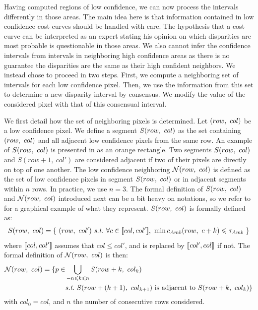 Having computed regions of low confidence, we can now process the intervals differently in those areas. The main idea here is that information contained in low confidence cost curves should be handled with care. The hypothesis that a cost curve can be interpreted as an expert stating his opinion on which disparities are most probable is questionable in those areas. We also cannot infer the confidence intervals from intervals in neighboring high confidence areas as there is no guarantee the disparities are the same as their high confident neighbors. We instead chose to proceed in two steps. First, we compute a neighboring set of intervals for each low confidence pixel. Then, we use the information from this set to determine a new disparity interval by consensus. We modify the value of the considered pixel with that of this consensual interval.

We first detail how the set of neighboring pixels is determined. Let $(row, ~col)$ be a low confidence pixel. We define a segment $S(row, ~col)$ as the set containing $(row, ~col)$ and all adjacent low confidence pixels from the same row. An example of $S(row, ~col)$ is presented in  as an orange rectangle. Two segments $S(row, ~col)$ and $S(row+1, ~col')$ are considered adjacent if two of their pixels are directly on top of one another. The low confidence neighboring $\mathcal{N}(row,~col)$ is defined as the set of low confidence pixels in segment $S(row, ~col)$ or in adjacent segments within $n$ rows. In practice, we use $n=3$. The formal definition of $S(row, ~col)$ and $\mathcal{N}(row,~col)$  introduced next can be a bit heavy on notations, so we refer to  for a graphical example of what they represent. $S(row, ~col)$ is formally defined as:
\begin{align}
    S(\rowcol) = \{~ (row,~col') \text{ \st }~\forall c\in\opi col, col'\cli,~\min c_{Amb}(row, ~c+k)\leqslant \tau_{Amb}~\}
\end{align}
where $[\![ col, col']\!]$ assumes that $col\leqslant col'$, and is replaced by $[\![ col', col]\!]$ if not. The formal definition of $\mathcal{N}(row,~col)$ is then:
\begin{align}
    \N(row,~col) = \{ p\in &\bigcup_{-n\leqslant k\leqslant n}S(row+k, ~col_k)\nonumber\\
    &\st~S(row + (k+1), ~col_{k+1})\text{ is adjacent to }S(row+k, ~col_{k})\}
\end{align}
with $col_0=col$, and $n$ the number of consecutive rows considered.

